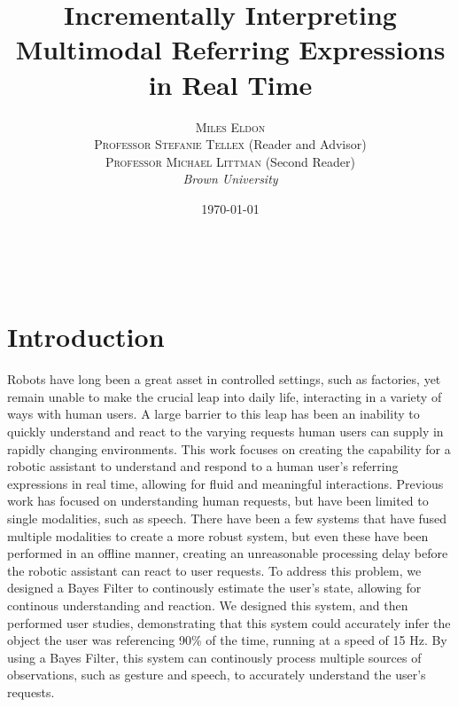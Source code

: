 \documentclass[a4paper, 11pt]{article} %
\title{\textbf{Incrementally Interpreting Multimodal Referring Expressions in Real Time}} %
\author{\textsc{Miles Eldon}\\ %
\textsc{Professor Stefanie Tellex} (Reader and Advisor)\\
{\textsc{Professor Michael Littman} (Second Reader)}
\\{\textit{Brown University}}} %
\date{\today} %
\makeatletter
\renewcommand{\maketitle}{ %
\begin{flushright} %
{\LARGE\@title} %

\vspace{50pt} %

{\large\@author} %
\\\@date %

\vspace{40pt} %
\end{flushright}
}
\makeatother
\begin{document}
\maketitle %
\tableofcontents
\section{Introduction}
Robots have long been a great asset in controlled settings, such as factories, yet remain unable to make the crucial leap into daily life, interacting in a variety of ways with human users. A large barrier to this leap has been an inability to quickly understand and react to the varying requests human users can supply in rapidly changing environments. This work focuses on creating the capability for a robotic assistant to understand and respond to a human user's referring expressions in real time, allowing for fluid and meaningful interactions. Previous work has focused on understanding human requests, but have been limited to single modalities, such as speech. There have been a few systems that have fused multiple modalities to create a more robust system, but even these have been performed in an offline manner, creating an unreasonable processing delay before the robotic assistant can react to user requests. To address this problem, we designed a Bayes Filter to continously estimate the user's state, allowing for continous understanding and reaction. We designed this system, and then performed user studies, demonstrating that this system could accurately infer the object the user was referencing 90\% of the time, running at a speed of 15 Hz. By using a Bayes Filter, this system can continously process multiple sources of observations, such as gesture and speech, to accurately understand the user's requests. 
\end{document}
